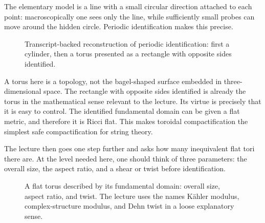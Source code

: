 The elementary model is a line with a small circular direction attached to each point: macroscopically one sees only the line, while sufficiently small probes can move around the hidden circle. Periodic identification makes this precise.

\begin{figure}[h]
\centering
{}
\caption{Transcript-backed reconstruction of periodic identification: first a cylinder, then a torus presented as a rectangle with opposite sides identified.}
\end{figure}

A torus here is a topology, not the bagel-shaped surface embedded in three-dimensional space. The rectangle with opposite sides identified is already the torus in the mathematical sense relevant to the lecture. Its virtue is precisely that it is easy to control. The identified fundamental domain can be given a flat metric, and therefore it is Ricci flat. This makes toroidal compactification the simplest safe compactification for string theory.

The lecture then goes one step further and asks how many inequivalent flat tori there are. At the level needed here, one should think of three parameters: the overall size, the aspect ratio, and a shear or twist before identification.

\begin{figure}[h]
\centering
{}
\caption{A flat torus described by its fundamental domain: overall size, aspect ratio, and twist. The lecture uses the names K\"ahler modulus, complex-structure modulus, and Dehn twist in a loose explanatory sense.}
\end{figure}


